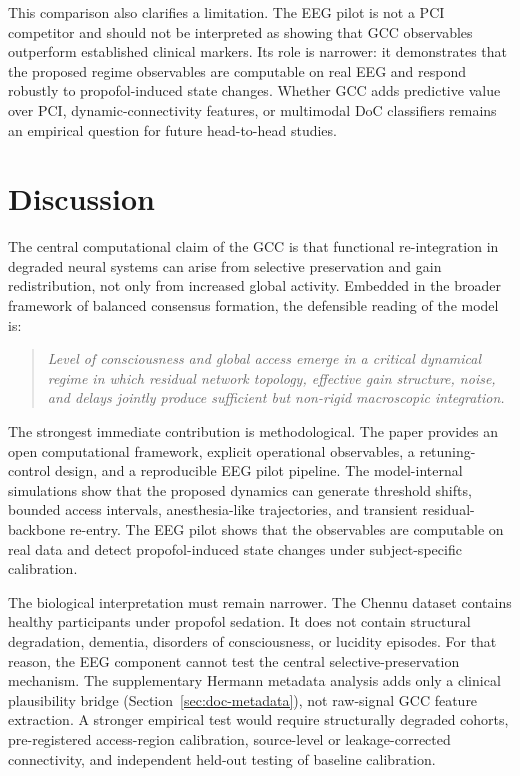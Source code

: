 ﻿\documentclass[11pt,a4paper]{article}
\theoremstyle{plain}
\theoremstyle{definition}
\theoremstyle{remark}
\begin{document}
This comparison also clarifies a limitation. The EEG pilot is not a PCI competitor and should not be interpreted as showing that GCC observables outperform established clinical markers. Its role is narrower: it demonstrates that the proposed regime observables are computable on real EEG and respond robustly to propofol-induced state changes. Whether GCC adds predictive value over PCI, dynamic-connectivity features, or multimodal DoC classifiers remains an empirical question for future head-to-head studies.


\section{Discussion}
\label{sec:diskussion}

The central computational claim of the GCC is that functional re-integration in degraded neural systems can arise from selective preservation and gain redistribution, not only from increased global activity. Embedded in the broader framework of balanced consensus formation, the defensible reading of the model is:

\begin{quote}
\itshape
Level of consciousness and global access emerge in a critical dynamical regime in which residual network topology, effective gain structure, noise, and delays jointly produce sufficient but non-rigid macroscopic integration.
\end{quote}

The strongest immediate contribution is methodological. The paper provides an open computational framework, explicit operational observables, a retuning-control design, and a reproducible EEG pilot pipeline. The model-internal simulations show that the proposed dynamics can generate threshold shifts, bounded access intervals, anesthesia-like trajectories, and transient residual-backbone re-entry. The EEG pilot shows that the observables are computable on real data and detect propofol-induced state changes under subject-specific calibration.

The biological interpretation must remain narrower. The Chennu dataset contains healthy participants under propofol sedation. It does not contain structural degradation, dementia, disorders of consciousness, or lucidity episodes. For that reason, the EEG component cannot test the central selective-preservation mechanism. The supplementary Hermann metadata analysis adds only a clinical plausibility bridge (Section~\ref{sec:doc-metadata}), not raw-signal GCC feature extraction. A stronger empirical test would require structurally degraded cohorts, pre-registered access-region calibration, source-level or leakage-corrected connectivity, and independent held-out testing of baseline calibration.
\end{document}
